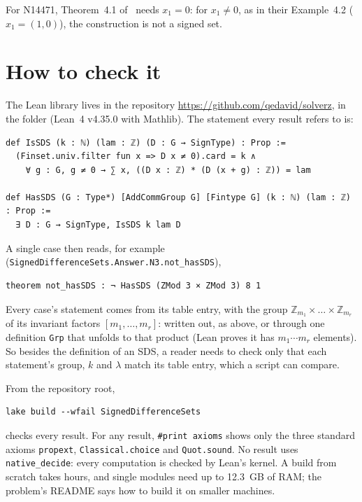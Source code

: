 \documentclass[11pt]{amsart}
\newcommand{\repo}{\url{https://github.com/qedavid/solverz}}
\begin{document}
For N14471, Theorem~4.1 of~\cite{he-chen-ge} needs $x_1 = 0$: for $x_1 \neq 0$, as in their
Example~4.2 ($x_1 = (1,0)$), the construction is not a signed set.

\section{How to check it}

The Lean library lives in the repository \repo, in the folder
 (Lean~4 v4.35.0 with Mathlib). The statement every
result refers to is:

\begin{Verbatim}[fontsize=\small]
def IsSDS (k : ℕ) (lam : ℤ) (D : G → SignType) : Prop :=
  (Finset.univ.filter fun x => D x ≠ 0).card = k ∧
    ∀ g : G, g ≠ 0 → ∑ x, ((D x : ℤ) * (D (x + g) : ℤ)) = lam

def HasSDS (G : Type*) [AddCommGroup G] [Fintype G] (k : ℕ) (lam : ℤ) : Prop :=
  ∃ D : G → SignType, IsSDS k lam D
\end{Verbatim}

\noindent A single case then reads, for example
(\texttt{SignedDifferenceSets.Answer.N3.not\_hasSDS}),

\begin{Verbatim}[fontsize=\small]
theorem not_hasSDS : ¬ HasSDS (ZMod 3 × ZMod 3) 8 1
\end{Verbatim}

\noindent Every case's statement comes from its table entry, with the group
$\mathbb{Z}_{m_1} \times \dots \times \mathbb{Z}_{m_r}$ of its invariant factors
$[m_1, \dots, m_r]$: written out, as above, or through one definition \texttt{Grp} that unfolds to that product (Lean proves it has
$m_1 \cdots m_r$ elements). So besides the definition of an SDS, a reader needs to check only
that each statement's group, $k$ and $\lambda$ match its table entry, which a script can
compare.

\noindent From the repository root,

\begin{Verbatim}[fontsize=\small]
lake build --wfail SignedDifferenceSets
\end{Verbatim}

\noindent checks every result. For any result, \texttt{\#print axioms} shows only the three
standard axioms \texttt{propext}, \texttt{Classical.choice} and \texttt{Quot.sound}. No result
uses \texttt{native\_decide}: every computation is checked by Lean's kernel. A build from
scratch takes hours, and single modules need up to 12.3~GB of RAM; the problem's README says
how to build it on smaller machines.
\end{document}

